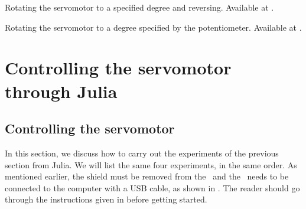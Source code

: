 \begin{pycode}
   {Rotating
    the servomotor to a specified degree and reversing.  Available at
    .}
  \label{py:servo-reverse}
  
\end{pycode}

\begin{pycode}
  \label{py:servo-loop}
  
\end{pycode}

\begin{pycode}
   {Rotating the servomotor to a degree specified by
    the potentiometer.  Available at .}
  \label{py:servo-pot}
  
\end{pycode}

\section{Controlling the servomotor through Julia}
\subsection{Controlling the servomotor}
\label{sec:servo-julia}
In this section, we discuss how to carry out the experiments of the
previous section from Julia.  We will list the same four experiments,
in the same order. As mentioned earlier, the shield must be removed from 
the \arduino\ and the \arduino\ needs to be connected to the computer 
with a USB cable, as shown in . 
The reader should go through the instructions given in  before getting started.


